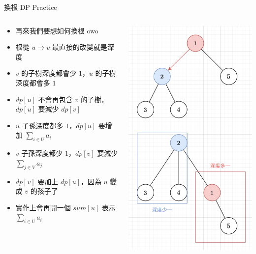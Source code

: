 \documentclass[aspectratio=169]{beamer}
\begin{document}
    \begin{frame}{換根 DP Practice}
        \begin{columns}
            \begin{column}{0.6\textwidth}
                \begin{itemize}
                    \item 再來我們要想如何換根 owo
                    \item<2-> 根從 $u \rightarrow v$ 最直接的改變就是深度
                    \item<2-> $v$ 的子樹深度都會少 $1$，$u$ 的子樹深度都會多 $1$
                    \item<3-> $dp[u]$ 不會再包含 $v$ 的子樹，$dp[u]$ 要減少 $dp[v]$
                    \item<4-> $u$ 子孫深度都多 $1$，$dp[u]$ 要增加 $\sum_{i \in U} a_i$ 
                    \item<4-> $v$ 子孫深度都少 $1$，$dp[v]$ 要減少 $\sum_{j \in V} a_j$
                    \item<5-> $dp[v]$ 要加上 $dp[u]$，因為 $u$ 變成 $v$ 的孩子了
                    \item<6-> 實作上會再開一個 $sum[u]$ 表示 $\sum_{i \in U} a_i$ 
                \end{itemize}
            \end{column}
            \begin{column}{0.4\textwidth}
                \begin{center}
                    \includegraphics[scale=0.36]{images/cf1072f_2.png}

\end{center}
\end{column}
\end{columns}
\end{frame}
\end{document}
